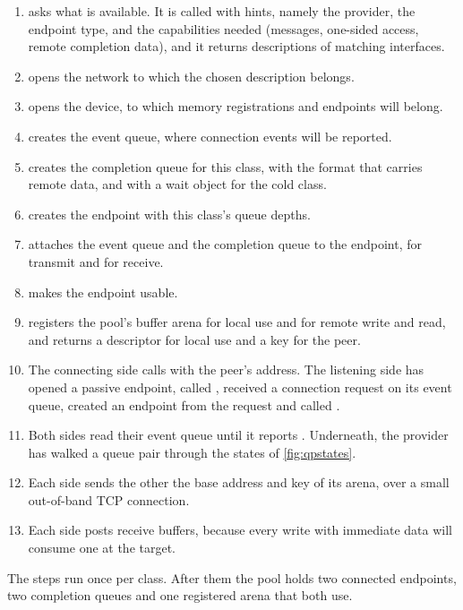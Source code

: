 \begin{enumerate}
  \item {} asks what is available. It is called with hints,
        namely the provider, the endpoint type, and the capabilities needed
        (messages, one-sided access, remote completion data), and it returns
        descriptions of matching interfaces.
  \item {} opens the network to which the chosen description
        belongs.
  \item {} opens the device, to which memory registrations and
        endpoints will belong.
  \item {} creates the event queue, where connection events
        will be reported.
  \item {} creates the completion queue for this class, with
        the format that carries remote data, and with a wait object for the
        cold class.
  \item {} creates the endpoint with this class's queue
        depths.
  \item {} attaches the event queue and the completion queue
        to the endpoint, for transmit and for receive.
  \item {} makes the endpoint usable.
  \item {} registers the pool's buffer arena for local use and
        for remote write and read, and returns a descriptor for local use and
        a key for the peer.
  \item The connecting side calls  with the peer's address.
        The listening side has opened a passive endpoint, called
        , received a connection request on its event queue,
        created an endpoint from the request and called .
  \item Both sides read their event queue until it reports
        . Underneath, the provider has walked a queue pair
        through the states of \cref{fig:qpstates}.
  \item Each side sends the other the base address and key of its arena,
        over a small out-of-band TCP connection.
  \item Each side posts receive buffers, because every write with immediate
        data will consume one at the target.
\end{enumerate}

The steps run once per class. After them the pool holds two connected
endpoints, two completion queues and one registered arena that both use.

